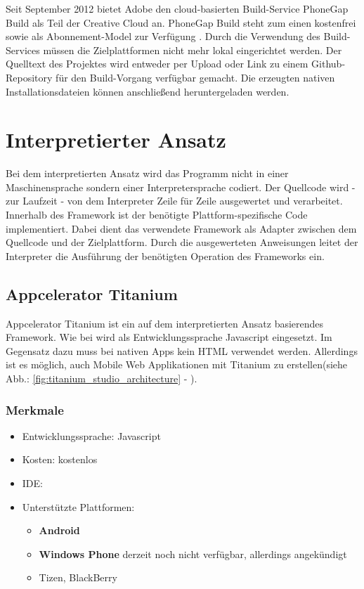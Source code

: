 \documentclass[../Bachelorarbeit.tex]{subfiles}
\begin{document}
Seit September 2012 bietet Adobe den cloud-basierten Build-Service PhoneGap Build als Teil der Creative Cloud an\parencite[vgl.][]{phonegapBuild_launch}. 
PhoneGap Build steht zum einen kostenfrei sowie als Abonnement-Model zur Verfügung
\parencite[vgl.][ab Abschnitt: Choose your plan]{phonegapBuild_gebuehren}. 
Durch die Verwendung des Build-Services müssen die Zielplattformen nicht mehr lokal eingerichtet werden. 
Der Quelltext des Projektes wird entweder per Upload oder Link zu einem Github-Repository für den Build-Vorgang verfügbar gemacht.
Die erzeugten nativen Installationsdateien können anschließend heruntergeladen werden.
\newpage

\section{Interpretierter Ansatz}
Bei dem interpretierten Ansatz wird das Programm nicht in einer Maschinensprache sondern einer Interpretersprache codiert. 
Der Quellcode wird - zur Laufzeit - von dem Interpreter Zeile für Zeile ausgewertet und verarbeitet.
Innerhalb des Framework ist der benötigte Plattform-spezifische Code implementiert.
Dabei dient das verwendete Framework als Adapter zwischen dem Quellcode und der Zielplattform. 
Durch die ausgewerteten Anweisungen leitet der Interpreter die Ausführung der benötigten Operation des Frameworks ein.



\subsection*{Appcelerator Titanium}
\label{subsec:titanium}

Appcelerator Titanium ist ein auf dem interpretierten Ansatz basierendes Framework.
Wie bei  wird als Entwicklungssprache Javascript eingesetzt. Im Gegensatz dazu muss bei nativen Apps kein \ac{HTML} verwendet werden. Allerdings ist es möglich, auch Mobile Web Applikationen mit Titanium zu erstellen(siehe Abb.: \ref{fig:titanium_studio_architecture} - ).


\subsubsection*{Merkmale}
\begin{itemize}
\item Entwicklungssprache: Javascript
\item Kosten:  kostenlos
\item \ac{IDE}: 
\item Unterstützte Plattformen: 
\begin{itemize}
\item \textbf{Android}
\item \textbf{Windows Phone} derzeit noch nicht verfügbar, allerdings angekündigt \parencite[vgl.][]{titanium_wp8Support}
\item Tizen, BlackBerry
\end{itemize}
\end{itemize}
\newpage
\end{document}
